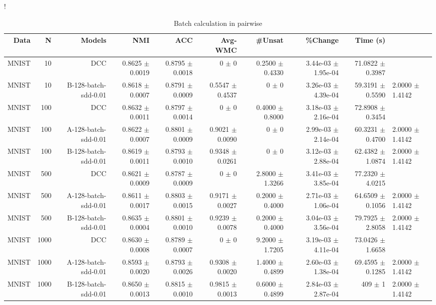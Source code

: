 \begin{table}[ht]
\caption{Batch calculation in pairwise}\label{tab:pw}
\resizebox{\columnwidth}!{
\begin{tabular}{ | r | r | r | r | r | r | r | r | r |}
\hline
Data & N & Models & NMI & ACC & Avg-WMC & #Unsat & \%Change & Time (s)  \\ \hline 
MNIST & 10 & DCC & 0.8625 $\pm$ 0.0019 & 0.8795 $\pm$ 0.0018 & 0 $\pm$ 0 & 0.2500 $\pm$ 0.4330 & 3.44e-03 $\pm$ 1.95e-04 & 71.0822 $\pm$ 0.3987 \\ 
MNIST & 10 & B-128-batch-sdd-0.01 & 0.8618 $\pm$ 0.0007 & 0.8791 $\pm$ 0.0009 & 0.5547 $\pm$ 0.4537 & 0 $\pm$ 0 & 3.26e-03 $\pm$ 4.39e-04 & 59.3191 $\pm$ 0.5590 & 2.0000 $\pm$ 1.4142 \\ \hdashline 
MNIST & 100 & DCC & 0.8632 $\pm$ 0.0011 & 0.8797 $\pm$ 0.0014 & 0 $\pm$ 0 & 0.4000 $\pm$ 0.8000 & 3.18e-03 $\pm$ 2.16e-04 & 72.8908 $\pm$ 0.3454 \\ 
MNIST & 100 & A-128-batch-sdd-0.01 & 0.8622 $\pm$ 0.0007 & 0.8801 $\pm$ 0.0009 & 0.9021 $\pm$ 0.0090 & 0 $\pm$ 0 & 2.99e-03 $\pm$ 2.14e-04 & 60.3231 $\pm$ 0.4700 & 2.0000 $\pm$ 1.4142 \\ \hdashline 
MNIST & 100 & B-128-batch-sdd-0.01 & 0.8619 $\pm$ 0.0011 & 0.8793 $\pm$ 0.0010 & 0.9348 $\pm$ 0.0261 & 0 $\pm$ 0 & 3.12e-03 $\pm$ 2.88e-04 & 62.4382 $\pm$ 1.0874 & 2.0000 $\pm$ 1.4142 \\ 
MNIST & 500 & DCC & 0.8621 $\pm$ 0.0009 & 0.8787 $\pm$ 0.0009 & 0 $\pm$ 0 & 2.8000 $\pm$ 1.3266 & 3.41e-03 $\pm$ 3.85e-04 & 77.2320 $\pm$ 4.0215 \\ \hdashline 
MNIST & 500 & A-128-batch-sdd-0.01 & 0.8611 $\pm$ 0.0017 & 0.8803 $\pm$ 0.0015 & 0.9171 $\pm$ 0.0027 & 0.2000 $\pm$ 0.4000 & 2.71e-03 $\pm$ 1.06e-04 & 64.6509 $\pm$ 0.1056 & 2.0000 $\pm$ 1.4142 \\ 
MNIST & 500 & B-128-batch-sdd-0.01 & 0.8635 $\pm$ 0.0004 & 0.8801 $\pm$ 0.0010 & 0.9239 $\pm$ 0.0078 & 0.2000 $\pm$ 0.4000 & 3.04e-03 $\pm$ 3.56e-04 & 79.7925 $\pm$ 2.8058 & 2.0000 $\pm$ 1.4142 \\ \hdashline 
MNIST & 1000 & DCC & 0.8630 $\pm$ 0.0008 & 0.8789 $\pm$ 0.0007 & 0 $\pm$ 0 & 9.2000 $\pm$ 1.7205 & 3.19e-03 $\pm$ 4.11e-04 & 73.0426 $\pm$ 1.6658 \\ 
MNIST & 1000 & A-128-batch-sdd-0.01 & 0.8593 $\pm$ 0.0020 & 0.8793 $\pm$ 0.0026 & 0.9308 $\pm$ 0.0020 & 1.4000 $\pm$ 0.4899 & 2.60e-03 $\pm$ 1.38e-04 & 69.4595 $\pm$ 0.1285 & 2.0000 $\pm$ 1.4142 \\ \hdashline 
MNIST & 1000 & B-128-batch-sdd-0.01 & 0.8650 $\pm$ 0.0013 & 0.8815 $\pm$ 0.0010 & 0.9815 $\pm$ 0.0013 & 0.6000 $\pm$ 0.4899 & 2.84e-03 $\pm$ 2.87e-04 & 409 $\pm$ 1 & 2.0000 $\pm$ 1.4142 \\ 

\end{tabular}}
\end{table}
